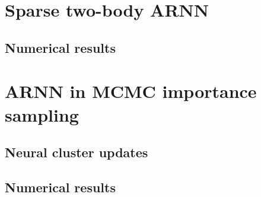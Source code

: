 \section{Sparse two-body ARNN}

\cite{biazzo2024sparse}

\subsection{Numerical results}

\section{ARNN in MCMC importance sampling}
\label{sec:arnn-mcmc}

\cite{nicoli2020asymptotically}

\cite{ciarella2023machine}

\subsection{Neural cluster updates}
\label{sec:ncus}

\cite{wu2021unbiased}

\subsection{Numerical results}
